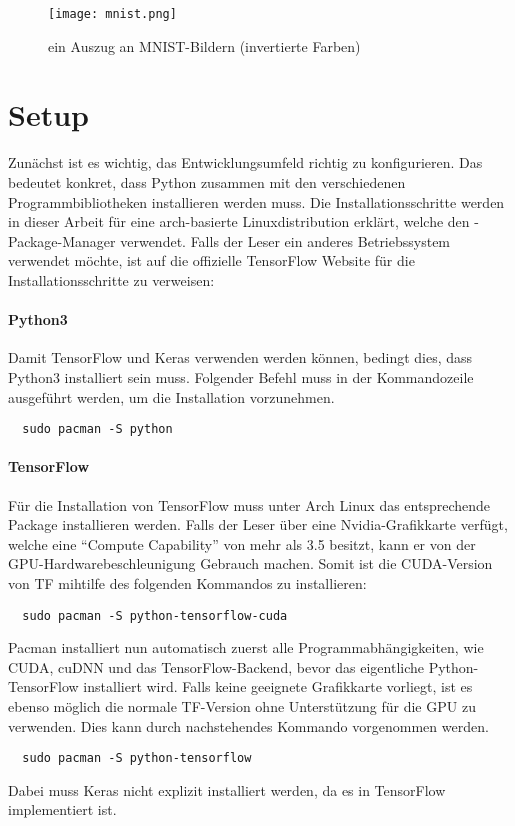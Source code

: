\begin{figure}
  \centering
  \texttt{[image: mnist.png]}
  \caption{ein Auszug an MNIST-Bildern (invertierte Farben) \cite{res:mnist_images}}
\end{figure}

\para{}
\cite{net:mnist}

\section{Setup}
Zunächst ist es wichtig, das Entwicklungsumfeld richtig zu konfigurieren. Das
bedeutet konkret, dass Python zusammen mit den verschiedenen Programmbibliotheken
installieren werden muss.
\para{}
Die Installationsschritte werden in dieser Arbeit für eine arch-basierte
Linuxdistribution erklärt, welche den -Package-Manager verwendet.
\para{}
Falls der Leser ein anderes Betriebssystem verwendet möchte, ist auf die offizielle
TensorFlow Website für die Installationsschritte zu verweisen:
\para{}

\paragraph{Python3}
Damit TensorFlow und Keras verwenden werden können, bedingt dies, dass Python3
installiert sein muss.
Folgender Befehl muss in der Kommandozeile ausgeführt werden, um die
Installation vorzunehmen.
\begin{verbatim}
  sudo pacman -S python
\end{verbatim}

\paragraph{TensorFlow}
Für die Installation von TensorFlow muss unter Arch Linux das entsprechende
Package installieren werden.
Falls der Leser über eine Nvidia-Grafikkarte verfügt, welche eine ``Compute
Capability'' von mehr als 3.5 besitzt, kann er von der
GPU-Hardwarebeschleunigung Gebrauch machen.
Somit ist die CUDA-Version von TF mihtilfe des folgenden Kommandos zu installieren:
\begin{verbatim}
  sudo pacman -S python-tensorflow-cuda
\end{verbatim}
Pacman installiert nun automatisch zuerst alle Programmabhängigkeiten, wie
CUDA, cuDNN und das TensorFlow-Backend, bevor das eigentliche
Python-TensorFlow installiert wird.
\para{}
Falls keine geeignete Grafikkarte vorliegt, ist es ebenso möglich die normale
TF-Version ohne Unterstützung für die GPU zu verwenden.
Dies kann durch nachstehendes Kommando vorgenommen werden.
\begin{verbatim}
  sudo pacman -S python-tensorflow
\end{verbatim}
\para{}
Dabei muss Keras nicht explizit installiert werden, da es in TensorFlow implementiert ist.

